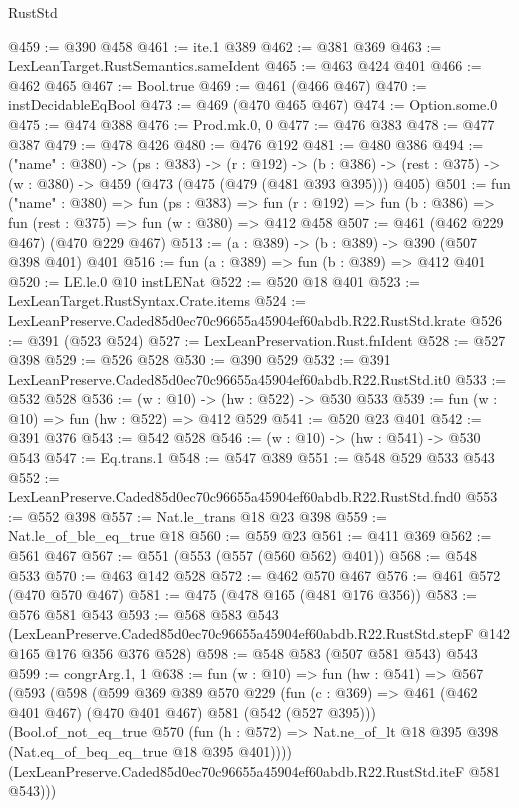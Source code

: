 \begin{lexlean}{RustStd}
\begin{coremodule}
@459 := @390 @458
@461 := ite.{1} @389
@462 := @381 @369
@463 := LexLeanTarget.RustSemantics.sameIdent
@465 := @463 @424 @401
@466 := @462 @465
@467 := Bool.true
@469 := @461 (@466 @467)
@470 := instDecidableEqBool
@473 := @469 (@470 @465 @467)
@474 := Option.some.{0}
@475 := @474 @388
@476 := Prod.mk.{0, 0}
@477 := @476 @383
@478 := @477 @387
@479 := @478 @426
@480 := @476 @192
@481 := @480 @386
@494 := ("name" : @380) ->
  (ps : @383) ->
  (r : @192) ->
  (b : @386) -> (rest : @375) -> (w : @380) -> @459 (@473 (@475 (@479 (@481 @393 @395))) @405)
@501 := fun ("name" : @380) =>
  fun (ps : @383) =>
  fun (r : @192) => fun (b : @386) => fun (rest : @375) => fun (w : @380) => @412 @458
@507 := @461 (@462 @229 @467) (@470 @229 @467)
@513 := (a : @389) -> (b : @389) -> @390 (@507 @398 @401) @401
@516 := fun (a : @389) => fun (b : @389) => @412 @401
@520 := LE.le.{0} @10 instLENat
@522 := @520 @18 @401
@523 := LexLeanTarget.RustSyntax.Crate.items
@524 := LexLeanPreserve.Caded85d0ec70c96655a45904ef60abdb.R22.RustStd.krate
@526 := @391 (@523 @524)
@527 := LexLeanPreservation.Rust.fnIdent
@528 := @527 @398
@529 := @526 @528
@530 := @390 @529
@532 := @391 LexLeanPreserve.Caded85d0ec70c96655a45904ef60abdb.R22.RustStd.it0
@533 := @532 @528
@536 := (w : @10) -> (hw : @522) -> @530 @533
@539 := fun (w : @10) => fun (hw : @522) => @412 @529
@541 := @520 @23 @401
@542 := @391 @376
@543 := @542 @528
@546 := (w : @10) -> (hw : @541) -> @530 @543
@547 := Eq.trans.{1}
@548 := @547 @389
@551 := @548 @529 @533 @543
@552 := LexLeanPreserve.Caded85d0ec70c96655a45904ef60abdb.R22.RustStd.fnd0
@553 := @552 @398
@557 := Nat.le_trans @18 @23 @398
@559 := Nat.le_of_ble_eq_true @18
@560 := @559 @23
@561 := @411 @369
@562 := @561 @467
@567 := @551 (@553 (@557 (@560 @562) @401))
@568 := @548 @533
@570 := @463 @142 @528
@572 := @462 @570 @467
@576 := @461 @572 (@470 @570 @467)
@581 := @475 (@478 @165 (@481 @176 @356))
@583 := @576 @581 @543
@593 := @568
    @583
    @543
    (LexLeanPreserve.Caded85d0ec70c96655a45904ef60abdb.R22.RustStd.stepF
      @142
      @165
      @176
      @356
      @376
      @528)
@598 := @548 @583 (@507 @581 @543) @543
@599 := congrArg.{1, 1}
@638 := fun (w : @10) =>
  fun (hw : @541) =>
  @567
    (@593
      (@598
        (@599
          @369
          @389
          @570
          @229
          (fun (c : @369) => @461 (@462 @401 @467) (@470 @401 @467) @581 (@542 (@527 @395)))
          (Bool.of_not_eq_true
            @570
            (fun (h : @572) => Nat.ne_of_lt @18 @395 @398 (Nat.eq_of_beq_eq_true @18 @395 @401))))
        (LexLeanPreserve.Caded85d0ec70c96655a45904ef60abdb.R22.RustStd.iteF @581 @543)))

\end{coremodule}
\end{lexlean}
